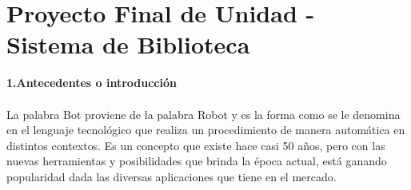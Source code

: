 \section{Proyecto Final de Unidad - Sistema de Biblioteca} 
\begin{flushleft}

\begin{itemize}
\textbf{1.Antecedentes o introducción}\\
\textbf{ }\\

La palabra Bot proviene de la palabra Robot y es la forma como se le denomina en el lenguaje tecnológico que realiza un procedimiento de manera automática en distintos contextos.
Es un concepto que existe hace casi 50 años, pero con las nuevas herramientas y posibilidades que brinda la época actual, está ganando popularidad dada las diversas aplicaciones que tiene en el mercado.\textbf{ }\\
\textbf{ }\\


\end{itemize}
\end{flushleft}
